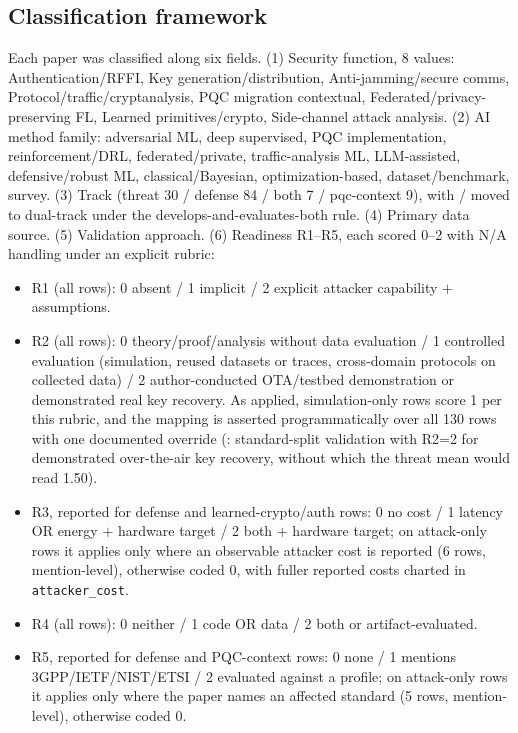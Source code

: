 \subsection{Classification framework}
Each paper was classified along six fields. (1) Security function, 8 values: Authentication/RFFI, Key generation/distribution, Anti-jamming/secure comms, Protocol/traffic/cryptanalysis, PQC migration contextual, Federated/privacy-preserving FL, Learned primitives/crypto, Side-channel attack analysis. (2) AI method family: adversarial ML, deep supervised, PQC implementation, reinforcement/DRL, federated/private, traffic-analysis ML, LLM-assisted, defensive/robust ML, classical/Bayesian, optimization-based, dataset/benchmark, survey. (3) Track (threat 30 / defense 84 / both 7 / pqc-context 9), with / moved to dual-track under the develops-and-evaluates-both rule. (4) Primary data source. (5) Validation approach. (6) Readiness R1--R5, each scored 0--2 with N/A handling under an explicit rubric:
\begin{itemize}\setlength\itemsep{1pt}
\item R1 (all rows): 0 absent / 1 implicit / 2 explicit attacker capability $+$ assumptions.
\item R2 (all rows): 0 theory/proof/analysis without data evaluation / 1 controlled evaluation (simulation, reused datasets or traces, cross-domain protocols on collected data) / 2 author-conducted OTA/testbed demonstration or demonstrated real key recovery. As applied, simulation-only rows score 1 per this rubric, and the mapping is asserted programmatically over all 130 rows with one documented override (: standard-split validation with R2=2 for demonstrated over-the-air key recovery, without which the threat mean would read 1.50).
\item R3, reported for defense and learned-crypto/auth rows: 0 no cost / 1 latency OR energy $+$ hardware target / 2 both $+$ hardware target; on attack-only rows it applies only where an observable attacker cost is reported (6 rows, mention-level), otherwise coded 0, with fuller reported costs charted in \texttt{attacker\_cost}.
\item R4 (all rows): 0 neither / 1 code OR data / 2 both or artifact-evaluated.
\item R5, reported for defense and PQC-context rows: 0 none / 1 mentions 3GPP/IETF/NIST/ETSI / 2 evaluated against a profile; on attack-only rows it applies only where the paper names an affected standard (5 rows, mention-level), otherwise coded 0.
\end{itemize}
